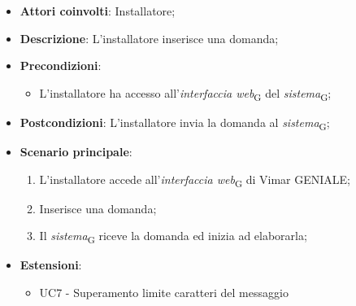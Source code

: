 \begin{itemize}
    \item \textbf{Attori coinvolti}: Installatore;
    \item \textbf{Descrizione}: L’installatore inserisce una domanda;
    \item \textbf{Precondizioni}: 
        \begin{itemize}
            \item L’installatore ha accesso all’\textit{interfaccia web}\textsubscript{G} del \textit{sistema}\textsubscript{G};
        \end{itemize}
    \item \textbf{Postcondizioni}: L'installatore invia la domanda al \textit{sistema}\textsubscript{G};
    \item \textbf{Scenario principale}:
    \begin{enumerate}
    \item L’installatore accede all’\textit{interfaccia web}\textsubscript{G} di Vimar GENIALE;
    \item Inserisce una domanda;
    \item Il \textit{sistema}\textsubscript{G} riceve la domanda ed inizia ad elaborarla;
    \end{enumerate}
    \item \textbf{Estensioni}: 
        \begin{itemize}
            \item UC7 - Superamento limite caratteri del messaggio
        \end{itemize}
\end{itemize}

